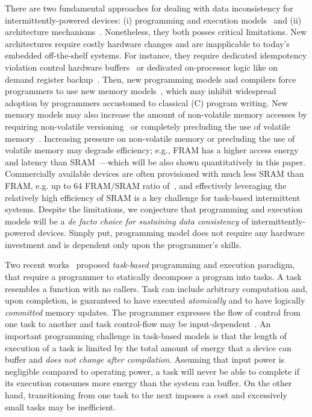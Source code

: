 
There are two fundamental approaches for dealing with data inconsistency for intermittently-powered devices: (i) programming and execution models~\cite{dino,ratchet,chain,alpaca} and (ii) architecture mechanisms~\cite{hicks_isca_2017,idetic,nvp}. Nonetheless, they both posses critical limitations. New architectures require costly hardware changes and are inapplicable to today's embedded off-the-shelf systems. For instance, they require dedicated idempotency violation control hardware buffers~\cite[Fig. 3]{hicks_isca_2017} or dedicated on-processor logic like on demand register backup~\cite[Fig. 9]{nvp}. Then, new programming models and compilers force programmers to use new memory models~\cite{chain,ratchet}, which may inhibit widespread adoption by programmers accustomed to classical (C) program writing. New memory models may also increase the amount of non-volatile memory accesses by requiring non-volatile versioning~\cite{chain} or completely precluding the use of volatile memory~\cite{ratchet}. Increasing pressure on non-volatile memory or precluding the use of volatile memory may degrade efficiency; e.g., FRAM has a higher access energy and latency than SRAM~\cite[Fig. 4]{nvp}---which will be also shown quantitatively in this paper. Commercially available devices are often provisioned with much less SRAM than FRAM, e.g. up to 64 FRAM/SRAM ratio of~\cite{wolverine}, and effectively leveraging the relatively high efficiency of SRAM is a key challenge for task-based intermittent systems. Despite the limitations, we conjecture that programming and execution models will be a {\em de facto choice for sustaining data consistency} of intermittently-powered devices. Simply put, programming model does not require any hardware investment and is dependent only upon the programmer's skills.


Two recent works~\cite{alpaca,chain} proposed {\em task-based} programming and execution paradigm, that require a programmer to statically decompose a program into tasks. A task resembles a function with no callers. Task can include arbitrary computation and, upon completion, is guaranteed to have executed {\em atomically} and to have logically {\em committed} memory updates. The programmer expresses the flow of control from one task to another and task control-flow may be input-dependent~\cite[Fig. 4]{chain}. An important programming challenge in task-based models is that the length of execution of a task is limited by the total amount of energy that a device can buffer and {\em does not change after compilation}. Assuming that input power is negligible compared to operating power, a task will never be able to complete if its execution consumes more energy than the system can buffer. On the other hand, transitioning from one task to the next imposes a cost and excessively small tasks may be inefficient. 

